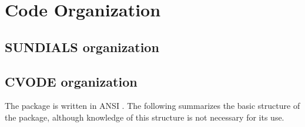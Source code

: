 \chapter{Code Organization}\label{s:organization}

\section{SUNDIALS organization}\label{ss:sun_org}


\section{CVODE organization}\label{ss:cvode_org}

The {\cvode} package is written in ANSI {\CC}. The following
summarizes the basic structure of the package, although knowledge
of this structure is not necessary for its use.

